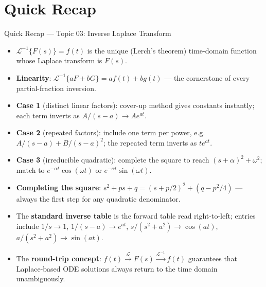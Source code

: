 \documentclass[12pt,a4paper]{article}
\begin{document}
\section{Quick Recap}

\begin{learnbox}{Quick Recap --- Topic 03: Inverse Laplace Transform}
\begin{itemize}
    \item $\mathcal{L}^{-1}\{F(s)\} = f(t)$ is the unique (Lerch's theorem)
          time-domain function whose Laplace transform is $F(s)$.
    \item \textbf{Linearity}: $\mathcal{L}^{-1}\{aF+bG\} = af(t)+bg(t)$ ---
          the cornerstone of every partial-fraction inversion.
    \item \textbf{Case 1} (distinct linear factors): cover-up method gives
          constants instantly; each term inverts as $A/(s-a)\to Ae^{at}$.
    \item \textbf{Case 2} (repeated factors): include one term per power,
          e.g.\ $A/(s-a)+B/(s-a)^{2}$; the repeated term inverts as
          $te^{at}$.
    \item \textbf{Case 3} (irreducible quadratic): complete the square to reach
          $(s+\alpha)^{2}+\omega^{2}$; match to $e^{-\alpha t}\cos(\omega t)$ or
          $e^{-\alpha t}\sin(\omega t)$.
    \item \textbf{Completing the square}: $s^{2}+ps+q = (s+p/2)^{2}+(q-p^{2}/4)$
          --- always the first step for any quadratic denominator.
    \item The \textbf{standard inverse table} is the forward table read
          right-to-left; entries include $1/s\to 1$, $1/(s-a)\to e^{at}$,
          $s/(s^{2}+a^{2})\to\cos(at)$, $a/(s^{2}+a^{2})\to\sin(at)$.
    \item The \textbf{round-trip concept}: $f(t)\xrightarrow{\mathcal{L}}F(s)
          \xrightarrow{\mathcal{L}^{-1}}f(t)$ guarantees that Laplace-based
          ODE solutions always return to the time domain unambiguously.
\end{itemize}
\end{learnbox}
\end{document}
